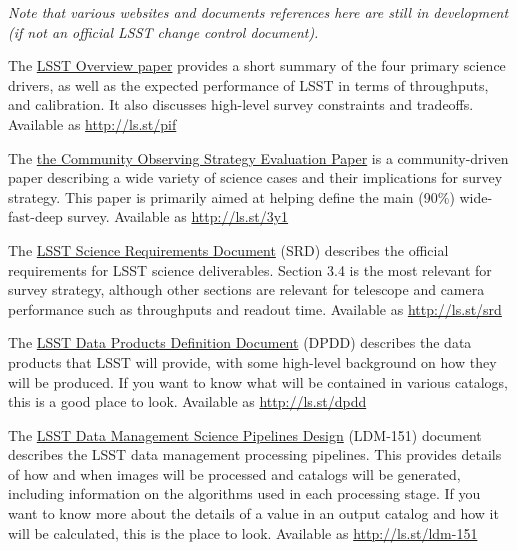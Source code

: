 \documentclass[DM,lsstdraft,toc,usenatbib]{lsstdoc}
\begin{document}
{\it Note that various websites and documents references here are still in development (if not an official LSST change control document).}

The \href{https://www.lsst.org/content/lsst-science-drivers-reference-design-and-anticipated-data-products}{LSST Overview paper} provides a short summary of the four primary science drivers, as well as the expected performance of LSST in terms of throughputs, and calibration. 
It also discusses high-level survey constraints and tradeoffs.  Available as \url{http://ls.st/pif}

The \href{https://github.com/LSSTScienceCollaborations/ObservingStrategy}{the Community Observing Strategy Evaluation Paper} is a community-driven paper describing a wide variety of science cases and their implications for survey strategy. This paper is primarily aimed at helping define the main (90\%) wide-fast-deep survey. Available as \url{http://ls.st/3y1}

The \href{http:/ls.st/srd}{LSST Science Requirements Document} (SRD) describes the official requirements for LSST science deliverables. Section 3.4 is the most relevant for survey strategy, although other sections are relevant for telescope and camera performance such as throughputs and readout time. Available as \url{http://ls.st/srd}

The \href{http://ls.st/dpdd}{LSST Data Products Definition Document} (DPDD) describes the data products that LSST will provide, with some high-level background on how they will be produced. If you want to know what will be contained in various catalogs, this is a good place to look. Available as \url{http://ls.st/dpdd}

The \href{http://ls.st/ldm-151}{LSST Data Management Science Pipelines Design} (LDM-151) document describes the LSST data management processing pipelines. This provides details of how and when images will be processed and catalogs will be generated, including information on the algorithms used in each processing stage. If you want to know more about the details of a value in an output catalog and how it will be calculated, this is the place to look. Available as \url{http://ls.st/ldm-151}

\end{document}
